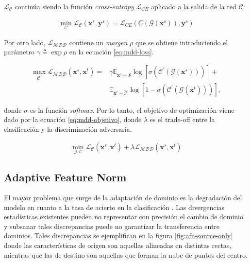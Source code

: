 $\mathcal{L}_{\mathcal{C}}$ continúa siendo la función {\it cross-entropy} $\mathcal{L}_{CE}$ aplicado a la salida de la red $\mathcal{C}$:

\begin{align}
  \min_{\mathcal{C}} \mathcal{L}_\mathcal{C}(\mathbf{x}^s, \mathbf{y}^s) = \mathcal{L}_{CE}(C(\mathcal{G}(\mathbf{x}^s)), \mathbf{y}^s)
  \label{eq:mdd-loss-clasificadora}
\end{align}

Por otro lado, $\mathcal{L}_{\mathcal{MDD}}$ contiene un {\it margen} $\rho$ que se obtiene introduciendo el parámetro
$\gamma \triangleq \exp \rho$ en la ecuación \ref{eq:mdd-loss}.

\begin{align}
  \max_{\mathcal{C}^{'}} \mathcal{L}_{\mathcal{MDD}}(\mathbf{x}^s, \mathbf{x}^t) = & \gamma \mathbb{E}_{\mathbf{x}^s \sim \mathcal{\hat{S}}} \log[\sigma(\mathcal{C}^{'}(\mathcal{G}(\mathbf{x}^s)))] + \nonumber \\
                                                                                   & \mathbb{E}_{\mathbf{x}^t \sim \mathcal{\hat{T}}} \log[1-\sigma(\mathcal{C}^{'}(\mathcal{G}(\mathbf{x}^t)))],
  \label{eq:mdd-loss}
\end{align}

\noindent
donde $\sigma$ es la función {\it softmax}. Por lo tanto, el objetivo de optimización viene dado por la ecuación
\ref{eq:mdd-objetivo}, donde $\lambda$ es el trade-off entre la clasificación y la discriminación adversaria.

\begin{align}
  \min_{\mathcal{G}, \mathcal{C}} \mathcal{L}_{\mathcal{C}}(\mathbf{x}^s, \mathbf{x}^t) + \lambda \mathcal{L}_{\mathcal{MDD}}(\mathbf{x}^s, \mathbf{x}^t)
  \label{eq:mdd-objetivo}
\end{align}

\subsection{Adaptive Feature Norm}

El mayor problema que surge de la adaptación de dominio es la degradación del modelo en cuanto a la tasa de acierto en
la clasificación \parencite{yosinski2014transferable}. Las divergencias estadísticas existentes pueden no representar con precisión el
cambio de dominio y subsanar tales discrepancias puede no garantizar la transferencia entre dominios. Tales
discrepancias se ejemplifican en la figura \ref{fig:afn-source-only} donde las características de origen son aquellas
alineadas en distintas rectas, mientras que las de destino son aquellas que forman la nube de puntos del centro.

